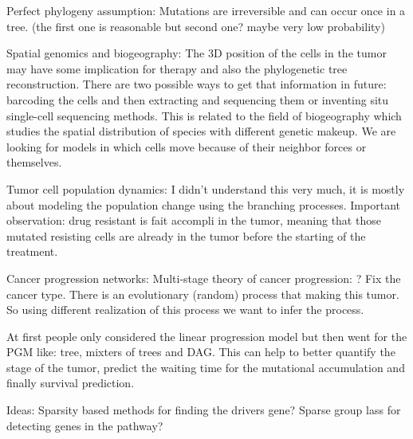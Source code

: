 	Perfect phylogeny assumption:
	Mutations are irreversible and can occur once in a tree. (the first one is reasonable but second one? maybe very low probability)
	
	Spatial genomics and biogeography:
	The 3D position of the cells in the tumor may have some implication for therapy and also the phylogenetic tree reconstruction. 
	There are two possible ways to get that information in future: barcoding the cells and then extracting and sequencing them or inventing situ single-cell sequencing methods. 
	This is related to the field of biogeography which studies the spatial distribution of species with different genetic makeup. 
	We are looking for models in which cells move because of their neighbor forces or themselves. 
	
	Tumor cell population dynamics:
	I didn't understand this very much, it is mostly about modeling the population change using the branching processes. 
	Important observation: drug resistant is fait accompli in the tumor, meaning that those mutated resisting cells are already in the tumor before the starting of the treatment. 
	
	Cancer progression networks:
	Multi-stage theory of cancer progression: ? 
	Fix the cancer type. There is an evolutionary (random) process that making this tumor. 
	So using different realization of this process we want to infer the process. 
	
	At first people only considered the linear progression model but then went for the PGM like: tree, mixters of trees and DAG. 
	This can help to better quantify the stage of the tumor, predict the waiting time for the mutational accumulation and finally survival prediction. 
	
	
	
	Ideas: 
	Sparsity based methods for finding the drivers gene?
	Sparse group lass for detecting genes in the pathway?  
	
	
	
	
	
	
	

	
	